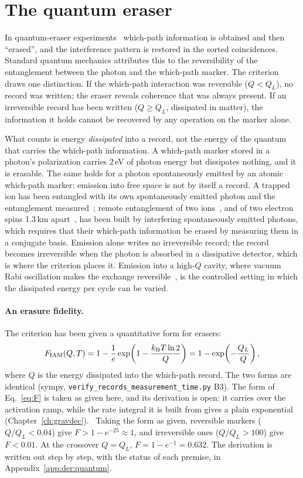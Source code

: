 \section{The quantum eraser}\label{sec:mp_eraser}
In quantum-eraser experiments~\cite{ScullyDruhl1982,Kim2000} which-path information is obtained and then ``erased'', and the interference pattern is
restored in the sorted coincidences. Standard quantum mechanics attributes this to the reversibility of the entanglement between the photon and the
which-path marker. The criterion draws one distinction. If the which-path interaction was reversible ($Q<Q_L$), no record was written; the eraser reveals
coherence that was always present. If an irreversible record has been written ($Q\ge Q_L$, dissipated in matter), the information it holds cannot be
recovered by any operation on the marker alone. \interp

What counts is energy \emph{dissipated} into a record, not the energy of the quantum that carries the which-path information. A which-path marker
stored in a photon's polarization carries 2\,eV of photon energy but dissipates nothing, and it is erasable. The same holds for a photon spontaneously
emitted by an atomic which-path marker: emission into free space is not by itself a record. A trapped ion has been entangled with its own
spontaneously emitted photon and the entanglement measured~\cite{Blinov2004}; remote entanglement of two ions~\cite{Moehring2007}, and of two electron
spins 1.3\,km apart~\cite{Hensen2015}, has been built by interfering spontaneously emitted photons, which requires that their which-path information be
erased by measuring them in a conjugate basis. \observed{} Emission alone writes no irreversible record; the record becomes irreversible when the photon
is absorbed in a dissipative detector, which is where the criterion places it. Emission into a high-$Q$ cavity, where vacuum Rabi oscillation makes the
exchange reversible~\cite{Haroche2006,Blais2021}, is the controlled setting in which the dissipated energy per cycle can be varied. \interp

\paragraph{An erasure fidelity.} The criterion has been given a quantitative form for erasers:
\begin{equation}
F_{\mathrm{IAM}}(Q,T)=1-\frac{1}{e}\exp\!\left(1-\frac{k_{\mathrm B} T\ln2}{Q}\right)=1-\exp\!\left(-\frac{Q_L}{Q}\right),
\label{eq:F}
\end{equation}
where $Q$ is the energy dissipated into the which-path record. The two forms are identical (sympy, \texttt{verify\_records\_measurement\_time.py} B3).
\calc{} The form of Eq.~\eqref{eq:F} is taken as given here, and its derivation is open: it carries over the activation ramp, while the rate integral it is built from gives a plain exponential (Chapter~\ref{ch:gravdec}). \conjecture\ Taking the form as given, reversible markers ($Q/Q_L<0.04$) give $F>1-e^{-25}\approx1$, and
irreversible ones ($Q/Q_L>100$) give $F<0.01$. \calc{} At the crossover $Q=Q_L$, $F=1-e^{-1}=0.632$.
The derivation is written out step by step, with the status of each premise, in Appendix~\ref{app:der:quantum}.

